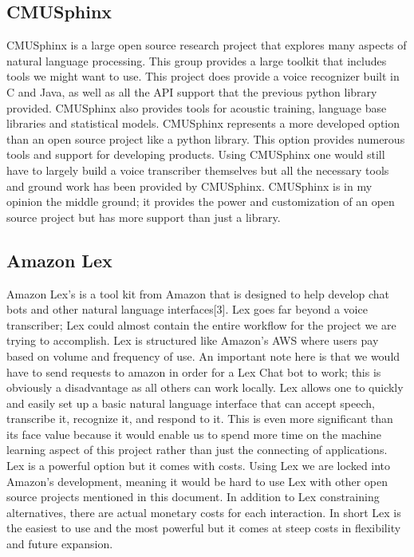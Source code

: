 \documentclass[onecolumn, draftclsnofoot,10pt, compsoc]{IEEEtran}
\begin{document}
    \subsection{CMUSphinx}
    CMUSphinx is a large open source research project that explores many aspects of natural language processing. 
    This group provides a large toolkit that includes tools we might want to use. 
    This project does provide a voice recognizer built in C and Java, as well as all the API support that the previous python library provided. 
    CMUSphinx also provides tools for acoustic training, language base libraries and statistical models. 
    CMUSphinx represents a more developed option than an open source project like a python library. 
    This option provides numerous tools and support for developing products. Using CMUSphinx one would still have to largely build a voice transcriber themselves but all the necessary tools and ground work has been provided by CMUSphinx. 
    CMUSphinx is in my opinion the middle ground; it provides the power and customization of an open source project but has more support than just a library.
    
    \subsection{Amazon Lex}
    Amazon Lex’s is a tool kit from Amazon that is designed to help develop chat bots and other natural language interfaces[3]. 
    Lex goes far beyond a voice transcriber; Lex could almost contain the entire workflow for the project we are trying to accomplish. 
    Lex is structured like Amazon’s AWS where users pay based on volume and frequency of use. 
    An important note here is that we would have to send requests to amazon in order for a Lex Chat bot to work; this is obviously a disadvantage as all others can work locally. 
    Lex allows one to quickly and easily set up a basic natural language interface that can accept speech, transcribe it, recognize it, and respond to it. This is even more significant than its face value because it would enable us to spend more time on the machine learning aspect of this project rather than just the connecting of applications. 
    Lex is a powerful option but it comes with costs. 
    Using Lex we are locked into Amazon’s development, meaning it would be hard to use Lex with other open source projects mentioned in this document. In addition to Lex constraining alternatives, there are actual monetary costs for each interaction.  
    In short Lex is the easiest to use and the most powerful but it comes at steep costs in flexibility and future expansion.
    
\end{document}
